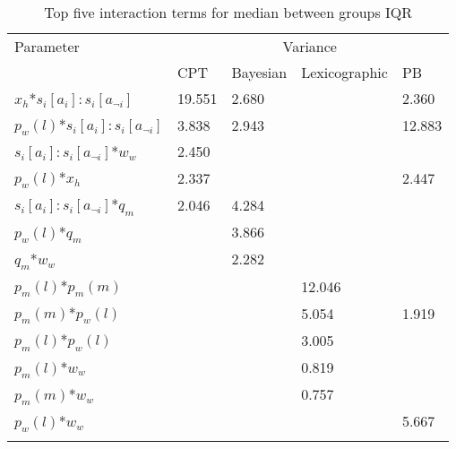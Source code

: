 \begin{table}[H]
\caption{Top five interaction terms for median between groups IQR \label{tab:sa_interaction_prospect_group_iqr}}
\begin{tabular} {lllll}
\hline\noalign{\smallskip}
Parameter & \multicolumn{4}{c}{Variance} \\ 
& \ac{CPT} & Bayesian & Lexicographic & \ac{PB} \\
\noalign{\smallskip}\svhline\noalign{\smallskip}

\(x_{h}\)*\(s_{i}[a_{i}]:s_{i}[a_{\neg i}]\) & 19.551 & 2.680&&2.360\\
\(p_{w}(l)\)*\(s_{i}[a_{i}]:s_{i}[a_{\neg i}]\) & 3.838 & 2.943 && 12.883\\
\(s_{i}[a_{i}]:s_{i}[a_{\neg i}]\)*\(w_{w}\) & 2.450\\
\(p_{w}(l)\)*\(x_{h}\) & 2.337 &&& 2.447\\
\(s_{i}[a_{i}]:s_{i}[a_{\neg i}]\)*\(q_{m}\) & 2.046 & 4.284\\
\(p_{w}(l)\)*\(q_{m}\) && 3.866\\
\(q_{m}\)*\(w_{w}\) && 2.282\\
\(p_{m}(l)\)*\(p_{m}(m)\) &&& 12.046\\
\(p_{m}(m)\)*\(p_{w}(l)\) &&& 5.054 & 1.919\\
\(p_{m}(l)\)*\(p_{w}(l)\) &&& 3.005\\
\(p_{m}(l)\)*\(w_{w}\) &&& 0.819\\
\(p_{m}(m)\)*\(w_{w}\) &&& 0.757\\
\(p_{w}(l)\)*\(w_{w}\) &&&& 5.667\\
\noalign{\smallskip}\hline\noalign{\smallskip}
\end{tabular}
\end{table}